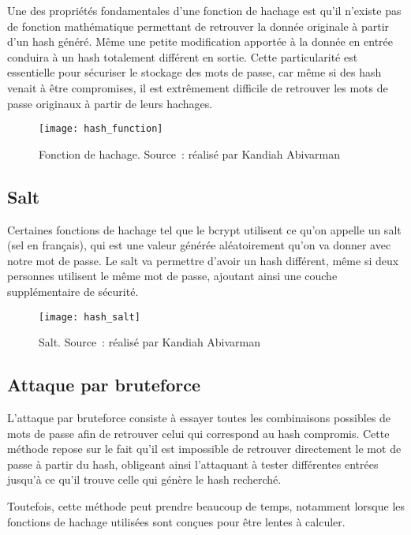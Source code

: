 Une des propriétés fondamentales d'une fonction de hachage est qu'il n'existe pas de fonction mathématique permettant de retrouver la donnée originale à partir d'un hash généré. 
Même une petite modification apportée à la donnée en entrée conduira à un hash totalement différent en sortie. 
Cette particularité est essentielle pour sécuriser le stockage des mots de passe, car même si des hash venait à être compromises, il est extrêmement difficile de retrouver les mots de passe originaux à partir de leurs hachages.

\newpage

\begin{figure}[tbph!]
	\centering
	\texttt{[image: hash\_function]}
	\caption[Fonction de hachage]{Fonction de hachage. Source : réalisé par Kandiah Abivarman}
	\label{fig:fonction_hachage}
\end{figure}


\subsection{Salt}

Certaines fonctions de hachage tel que le bcrypt utilisent ce qu'on appelle un salt (sel en français), qui est une valeur générée aléatoirement qu'on va donner avec notre mot de passe. Le salt va permettre d'avoir un hash différent, même si deux personnes utilisent le même mot de passe, ajoutant ainsi une couche supplémentaire de sécurité.

\begin{figure}[tbph!]
	\centering
	\texttt{[image: hash\_salt]}
	\caption[Salt]{Salt. Source : réalisé par Kandiah Abivarman}
	\label{fig:hash_salt}
\end{figure}

\newpage

\subsection{Attaque par bruteforce}

L'attaque par bruteforce consiste à essayer toutes les combinaisons possibles de mots de passe afin de retrouver celui qui correspond au hash compromis. Cette méthode repose sur le fait qu'il est impossible de retrouver directement le mot de passe à partir du hash, obligeant ainsi l'attaquant à tester différentes entrées jusqu'à ce qu'il trouve celle qui génère le hash recherché.

Toutefois, cette méthode peut prendre beaucoup de temps, notamment lorsque les fonctions de hachage utilisées sont conçues pour être lentes à calculer.